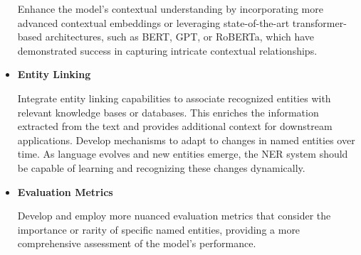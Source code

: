 \begin{itemize}
Enhance the model's contextual understanding by incorporating more advanced contextual embeddings or leveraging state-of-the-art transformer-based architectures, such as BERT, GPT, or RoBERTa, which have demonstrated success in capturing intricate contextual relationships.\\

\item \textbf{Entity Linking}

Integrate entity linking capabilities to associate recognized entities with relevant knowledge bases or databases. This enriches the information extracted from the text and provides additional context for downstream applications. Develop mechanisms to adapt to changes in named entities over time. As language evolves and new entities emerge, the NER system should be capable of learning and recognizing these changes dynamically.
 
\item \textbf{Evaluation Metrics}

Develop and employ more nuanced evaluation metrics that consider the importance or rarity of specific named entities, providing a more comprehensive assessment of the model's performance.
\end{itemize}

 